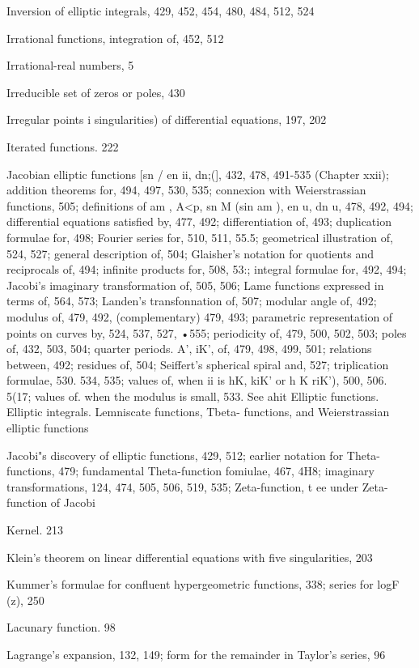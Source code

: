 Inversion of elliptic integrals, 429, 452, 454, 480, 484, 512, 524

Irrational functions, integration of, 452, 512

Irrational-real numbers, 5

%
%

Irreducible set of zeros or poles, 430

Irregular points i singularities) of differential equations, 197, 202

Iterated functions. 222

Jacobian elliptic functions [sn /  en ii, dn;(], 432, 478, 491-535 (Chapter xxii); addition theorems
for, 494, 497, 530, 535; connexion with Weierstrassian functions, 505; definitions of am  ,
A<p, sn M (sin am  ), en u, dn u, 478, 492, 494; differential equations satisfied by, 477, 492;
differentiation of, 493; duplication formulae for, 498; Fourier series for, 510, 511, 55.5;
geometrical illustration of, 524, 527; general description of, 504; Glaisher's notation for
quotients and reciprocals of, 494; infinite products for, 508, 53:; integral formulae for, 492,
494; Jacobi's imaginary transformation of, 505, 506; Lame functions expressed in terms of,
564, 573; Landen's transfonnation of, 507; modular angle of, 492; modulus of, 479, 492,
(complementary) 479, 493; parametric representation of points on curves by, 524, 537, 527,
•555; periodicity of, 479, 500, 502, 503; poles of, 432, 503, 504; quarter periods. A', iK', of,
479, 498, 499, 501; relations between, 492; residues of, 504; Seiffert's spherical spiral and,
527; triplication formulae, 530. 534, 535; values of, when ii is hK, kiK' or h  K riK'), 500,
506. 5(17; values of. when the modulus is small, 533. See ahit Elliptic functions. Elliptic
integrals. Lemniscate functions, Tbeta- functions, and Weierstrassian elliptic functions

Jacobi"s discovery of elliptic functions, 429, 512; earlier notation for Theta-functions, 479;
fundamental Theta-function fomiulae, 467, 4H8; imaginary transformations, 124, 474, 505,
506, 519, 535; Zeta-function, t ee under Zeta-function of Jacobi

Kernel. 213

Klein's theorem on linear differential equations with five singularities, 203

Kummer's formulae for confluent hypergeometric functions, 338; series for logF (z), 250

Lacunary function. 98

Lagrange's expansion, 132, 149; form for the remainder in Taylor's series, 96

